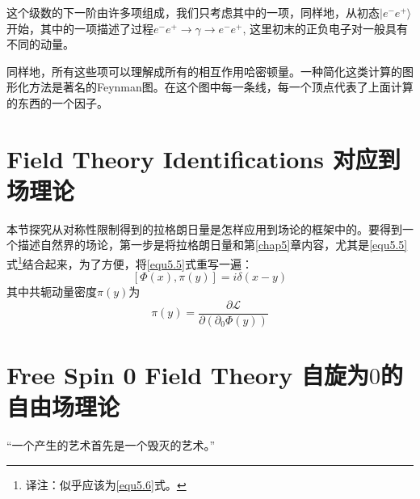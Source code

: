 这个级数的下一阶由许多项组成，我们只考虑其中的一项，同样地，从初态$|e^{-}e^{+} \rangle$开始，其中的一项描述了过程$e^{-}e^{+} \to \gamma \to e^{-}e^{+}$, 这里初末的正负电子对一般具有不同的动量。

同样地，所有这些项可以理解成所有的相互作用哈密顿量。一种简化这类计算的图形化方法是著名的Feynman图。在这个图中每一条线，每一个顶点代表了上面计算的东西的一个因子。

\section[对应到场理论]{Field Theory Identifications \quad 对应到场理论}
\label{sec9.1}
本节探究从对称性限制得到的拉格朗日量是怎样应用到场论的框架中的。要得到一个描述自然界的场论，第一步是将拉格朗日量和第\ref{chap5}章内容，尤其是\eqref{equ5.5}式\footnote{译注：似乎应该为\eqref{equ5.6}式。}结合起来，为了方便，将\eqref{equ5.5}式重写一遍：
\begin{equation}
\label{equ9.1}
    [\Phi(x), \pi(y)] = i\delta(x - y)
\end{equation}
其中共轭动量密度$\pi(y)$为
\begin{equation}
\label{equ9.2}
    \pi(y)=\frac{\partial \mathscr{L}}{\partial(\partial_{0}\Phi(y))}
\end{equation}
\section[自旋为$0$的自由场理论]{Free Spin 0 Field Theory \quad 自旋为$0$的自由场理论}
\label{sec9.2}
{\small “一个产生的艺术首先是一个毁灭的艺术。”\\}

